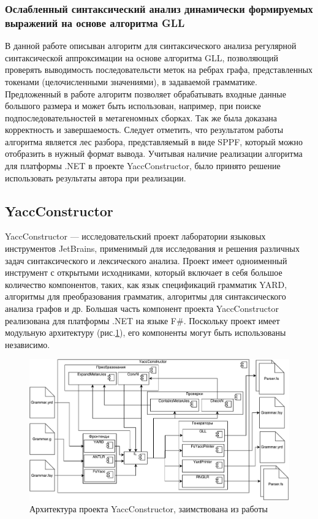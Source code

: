 \documentclass[14pt]{matmex-diploma-custom}
\begin{document}
		\subsubsection*{Ослабленный синтаксический анализ динамически формируемых выражений на основе алгоритма GLL}
		В данной работе описыван алгоритм для синтаксического анализа регулярной синтаксической аппроксимации на основе алгоритма GLL, позволяющий проверять выводимость последовательсти меток на ребрах графа, представленных токенами (целочисленными значениями), в задаваемой грамматике. Предложенный в работе алгоритм позволяет обрабатывать входные данные большого размера и может быть использован, например, при поиске подпоследовательностей в метагеномных сборках. Так же была доказана корректность и завершаемость. Следует отметить, что результатом работы алгоритма является лес разбора, представляемый в виде SPPF\cite{SPPF}, который можно отобразить в нужный формат вывода. Учитывая наличие реализации алгоритма для платформы .NET в проекте YaccConstructor, было принято решение использовать результаты автора при реализации.

	\subsection{YaccConstructor}
	    YaccConstructor --- исследовательский проект лаборатории языковых инструментов JetBrains, применимый для исследования и решения различных задач синтаксического и лексического анализа. Проект имеет одноименный инструмент с открытыми исходниками, который включает в себя большое количество компонентов, таких, как язык спецификаций грамматик YARD, алгоритмы для преобразования грамматик, алгоритмы для синтаксического анализа графов и др. Большая часть компонент проекта YaccConstructor реализована для платформы .NET на языке F\#. Поскольку проект имеет модульную архитектуру (рис.\ref{arch}), его компоненты могут быть использованы независимо.
	    
        \begin{figure}
            \centering
            \includegraphics[width=\textwidth]{pics/YCArch.pdf}
            \caption{Архитектура проекта YaccConstructor, заимствована из работы \cite{gsv_phd} \label{arch}}
        \end{figure}
	    
\end{document}
